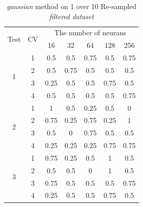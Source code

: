 \documentclass[draft,dvipsnames]{drexel-thesis}
\begin{document}
\begin{thesis}
\begin{table}[!t]
\centering
\caption{{\em gaussian} method on 1 over 10 Re-sampled {\em filtered dataset}}
\label{tbl:gaussian_1_10}
\begin{tabular}{|c|c|c|c|c|c|c|}
\hline
\multirow{2}{*}{Test} & \multirow{2}{*}{CV} & \multicolumn{5}{c|}{The number of neurans}                               \\ \cline{3-7}
                      &                     & 16           & 32           & 64           & 128          & 256          \\ \hline
\multirow{4}{*}{1}    & 1                   & 0.5          & 0.5          & 0.75         & 0.5          & 0.75         \\ \cline{2-7}
                      & 2                   & 0.5          & 0.75         & 0.5          & 0.5          & 0.5          \\ \cline{2-7}
                      & 3                   & 0.25         & 0.5          & 0.5          & 0.75         & 0.5          \\ \cline{2-7}
                      & 4                   & 0.5          & 0.5          & 0.5          & 0.5          & 0.75         \\ \hline
\multirow{4}{*}{2}    & 1                   & 1            & 0.5          & 0.25         & 0.5          & 0            \\ \cline{2-7}
                      & 2                   & 0.75         & 0.25         & 0.75         & 0.25         & 1            \\ \cline{2-7}
                      & 3                   & 0.5          & 0            & 0.75         & 0.5          & 0.5          \\ \cline{2-7}
                      & 4                   & 0.25         & 0.25         & 0.25         & 0.75         & 0.75         \\ \hline
\multirow{4}{*}{3}    & 1                   & 0.75         & 0.25         & 0.5          & 1            & 0.5          \\ \cline{2-7}
                      & 2                   & 0.5          & 0.5          & 0            & 1            & 0.5          \\ \cline{2-7}
                      & 3                   & 0.75         & 0.5          & 0.5          & 0.5          & 0.75         \\ \cline{2-7}
                      & 4                   & 0.25         & 0.5          & 0.5          & 0.75         & 0.5          \\ \hline

\end{tabular}
\end{table}
\end{thesis}
\end{document}
